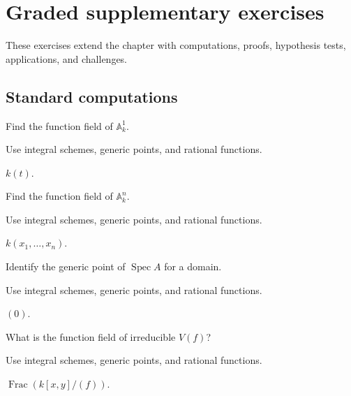 \section{Graded supplementary exercises}
These exercises extend the chapter with computations, proofs, hypothesis tests, applications, and challenges.

\subsection*{Standard computations}

\begin{exercise}\label{exr:vi27-expand-01}
Find the function field of $\mathbb A^1_k$.
\end{exercise}
\begin{hint}
Use integral schemes, generic points, and rational functions.
\end{hint}
\begin{solution}
$k(t)$.
\end{solution}

\begin{exercise}\label{exr:vi27-expand-02}
Find the function field of $\mathbb A^n_k$.
\end{exercise}
\begin{hint}
Use integral schemes, generic points, and rational functions.
\end{hint}
\begin{solution}
$k(x_1,\ldots,x_n)$.
\end{solution}

\begin{exercise}\label{exr:vi27-expand-03}
Identify the generic point of $\operatorname{Spec}A$ for a domain.
\end{exercise}
\begin{hint}
Use integral schemes, generic points, and rational functions.
\end{hint}
\begin{solution}
$(0)$.
\end{solution}

\begin{exercise}\label{exr:vi27-expand-04}
What is the function field of irreducible $V(f)$?
\end{exercise}
\begin{hint}
Use integral schemes, generic points, and rational functions.
\end{hint}
\begin{solution}
$\operatorname{Frac}(k[x,y]/(f))$.
\end{solution}

